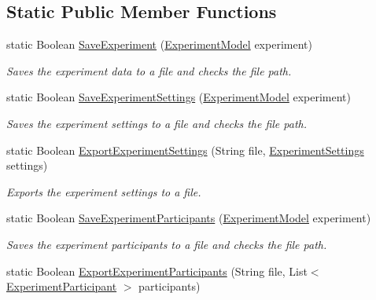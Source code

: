 \subsection*{Static Public Member Functions}
\begin{DoxyCompactItemize}
\item 
static Boolean \hyperlink{class_web_analyzer_1_1_controller_1_1_export_controller_a4b85a3cd4921ac619d484d0c3d2b031b}{Save\+Experiment} (\hyperlink{class_web_analyzer_1_1_models_1_1_base_1_1_experiment_model}{Experiment\+Model} experiment)
\begin{DoxyCompactList}\small\item\em Saves the experiment data to a file and checks the file path. \end{DoxyCompactList}\item 
static Boolean \hyperlink{class_web_analyzer_1_1_controller_1_1_export_controller_a293a07018f0a6c4380482d58c5080852}{Save\+Experiment\+Settings} (\hyperlink{class_web_analyzer_1_1_models_1_1_base_1_1_experiment_model}{Experiment\+Model} experiment)
\begin{DoxyCompactList}\small\item\em Saves the experiment settings to a file and checks the file path. \end{DoxyCompactList}\item 
static Boolean \hyperlink{class_web_analyzer_1_1_controller_1_1_export_controller_a07d9ecbb84733af809963c54cb03640a}{Export\+Experiment\+Settings} (String file, \hyperlink{class_web_analyzer_1_1_models_1_1_settings_model_1_1_experiment_settings}{Experiment\+Settings} settings)
\begin{DoxyCompactList}\small\item\em Exports the experiment settings to a file. \end{DoxyCompactList}\item 
static Boolean \hyperlink{class_web_analyzer_1_1_controller_1_1_export_controller_a8f08f0812bc86eaca9e42e076874ea94}{Save\+Experiment\+Participants} (\hyperlink{class_web_analyzer_1_1_models_1_1_base_1_1_experiment_model}{Experiment\+Model} experiment)
\begin{DoxyCompactList}\small\item\em Saves the experiment participants to a file and checks the file path. \end{DoxyCompactList}\item 
static Boolean \hyperlink{class_web_analyzer_1_1_controller_1_1_export_controller_a7c0f91af885d253606a2b66dc2502dea}{Export\+Experiment\+Participants} (String file, List$<$ \hyperlink{class_web_analyzer_1_1_models_1_1_base_1_1_experiment_participant}{Experiment\+Participant} $>$ participants)

\end{DoxyCompactItemize}
